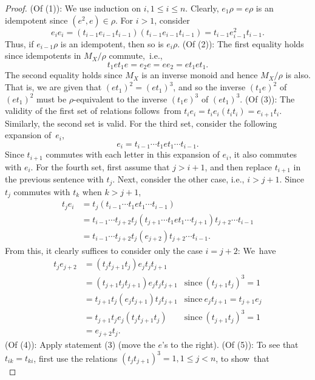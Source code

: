 \documentclass{surv-l}
\numberwithin{equation}{section}
\numberwithin{table}{section}
\numberwithin{figure}{section}
\theoremstyle{plain}
\theoremstyle{definition}
\begin{document}
\begin{proof} (Of (1)): We use induction on $i, 1\leq
i\leq n$. Clearly, $ e_{1}\rho=e\rho$ is an idempotent since
$(e^{2}, e)\in\rho$. For $i>1$, consider
\[
e_{i}e_{i}=(t_{i-1}e_{i-1}t_{i-1})(t_{i-1}e_{i-1}t_{i-1})=t_{i-1}e_{i-1}^{2}t_{i-1}.
\]
Thus, if $e_{i-1}\rho$ is an idempotent, then so is
$e_{i}\rho$. (Of (2)): The first equality holds since
idempotents in $M_{X}/\rho$ commute,~i.e.,
\[
t_{1}et_{1}e=e_{2}e=ee_{2}=et_{1}et_{1}.
\]
The second equality holds since $M_{X}$ is an inverse monoid
and hence $M_{X}/\rho$ is also. That is, we are given that
$(et_1)^{2}=(et_{1})^{3}$, and so the inverse $(t_{1}e)^{2}$
of $(et_{1})^{2}$ must be $\rho$-equivalent to the inverse
$(t_{1}e)^{3}$ of $(et_{1})^{3}$. (Of (3)): The validity of
the first set of relations follows~from
$t_{i}e_{i}=t_{i}e_{i}(t_{i}t_{i})=e_{i+1}t_{i}$. Similarly,
the second set is valid. For the third set, consider the
following expansion of~$e_{i}$,
\[
e_{i}=t_{i-1}\cdots t_{1}et_{1}\cdots t_{i-1}.
\]
Since $t_{i+1}$ commutes with each letter in this expansion of
$e_{i}$, it also commutes with $e_{i}$. For the fourth set,
first assume that $j>i+1$, and then replace $t_{i+1}$ in the
previous sentence with $t_{j}$. Next, consider the other case,
i.e., $i>j+1$. Since $t_{j}$ commutes with $t_{k}$ when $k>j+1$,
\begin{align*}
t_{j}e_{i}&=t_{j}(t_{i-1}\cdots t_{1}et_{1}\cdots t_{i-1}) \\
&=t_{i-1}\cdots t_{j+2}t_{j}(t_{j+1}\cdots t_{1}et_{1}\cdots t_{j+1})t_{j+2}\cdots t_{i-1} \\
&=t_{i-1}\cdots t_{j+2}t_{j}(e_{j+2})t_{j+2}\cdots t_{i-1}.
\end{align*}
From this, it clearly suffices to consider only the case
$i=j+2$: We~have
\[
\begin{array}{lll}
t_{j}e_{j+2} &=(t_{j}t_{j+1}t_{j})e_{j}t_{j}t_{j+1} & \\
&=(t_{j+1}t_{j}t_{j+1})e_{j}t_{j}t_{j+1} &\mathrm{since}\ (t_{j+1}t_{j})^{3}=1\\
&=t_{j+1}t_{j}(e_{j}t_{j+1})t_{j}t_{j+1} &\mathrm{since}\  e_{j}t_{j+1}=t_{j+1}e_{j} \\
&=t_{j+1}t_{j}e_{j}(t_{j}t_{j+1}t_{j}) &\mathrm{since}\ (t_{j+1}t_{j})^{3}=1 \\
&=e_{j+2}t_{j}. &
\end{array}
\]
(Of (4)): Apply statement (3) (move the $e$'s to the right). (Of
(5)): To see that $t_{ik}=t_{ki}$, first use the relations
$(t_{j}t_{j+1})^{3}=1,1\leq j<n$, to show~that
\begin{equation}\label{eq9.43.3}

\end{equation}
\end{proof}
\end{document}
